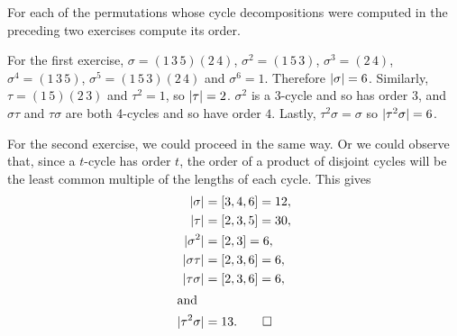  For each of the permutations whose cycle decompositions
were computed in the preceding two exercises compute its order.
\begin{solution}
  For the first exercise, $\sigma = (1\,3\,5)(2\,4)$,
  $\sigma^2 = (1\,5\,3)$, $\sigma^3 = (2\,4)$, $\sigma^4 = (1\,3\,5)$,
  $\sigma^5 = (1\,5\,3)(2\,4)$ and $\sigma^6 = 1$. Therefore
  $\lvert{\sigma}\rvert = 6$. Similarly, $\tau = (1\,5)(2\,3)$ and
  $\tau^2 = 1$, so $\lvert{\tau}\rvert = 2$. $\sigma^2$ is a 3-cycle and so
  has order $3$, and $\sigma\tau$ and $\tau\sigma$ are both 4-cycles
  and so have order $4$. Lastly, $\tau^2\sigma = \sigma$ so
  $\lvert{\tau^2\sigma}\rvert = 6$.

  For the second exercise, we could proceed in the same way. Or we
  could observe that, since a $t$-cycle has order $t$, the order of a
  product of disjoint cycles will be the least common multiple of the
  lengths of each cycle. This gives
  \begin{align*}
    \lvert{\sigma}\rvert &= [3,4,6] = 12, \\
    \lvert{\tau}\rvert &= [2,3,5] = 30, \\
    \lvert{\sigma^2}\rvert &= [2,3] = 6, \\
    \lvert{\sigma\tau}\rvert &= [2,3,6] = 6, \\
    \lvert{\tau\sigma}\rvert &= [2,3,6] = 6, \\
    \intertext{and}
    \lvert{\tau^2\sigma}\rvert &= 13. \qedhere
  \end{align*}
\end{solution}

